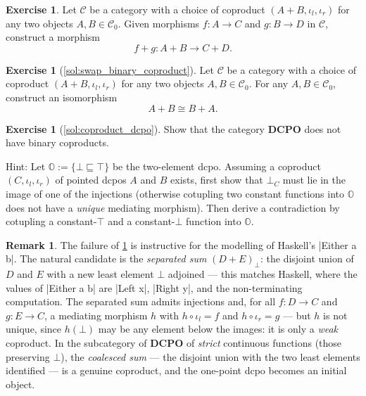 \documentclass[a4paper,11pt, oneside,titlepage=false]{scrbook}
\theoremstyle{plain}
\theoremstyle{definition}
\newtheorem{rem}[thm]{Remark}
\newtheorem{exer}[thm]{Exercise}
\newcommand{\Cat}[1]{\mathcal{#1}}
\newcommand{\CC}{\Cat{C}}
\newcommand{\Catb}[1]{\mathbf{#1}}
\newcommand{\DCPO}{\Catb{DCPO}}
\newcommand{\Ob}[1]{{#1}_0}
\newcommand{\inl}{\ensuremath{\iota_l}}
\newcommand{\inr}{\ensuremath{\iota_r}}
\newcommand{\co}[2]{\ensuremath{#2 \circ #1}}
\begin{document}
\begin{exer}\label{exer:coproduct_of_morphisms}
  Let $\CC$ be a category with a choice of coproduct $(A + B, \inl, \inr)$ for any two objects $A,B\in \Ob{\CC}$.
  Given morphisms $f : A \to C$ and $g : B \to D$ in $\CC$, construct a morphism
  \[ f + g : A + B \to C + D.\]
\end{exer}

\begin{exer}[\cref{sol:swap_binary_coproduct}]\label{exer:swap_binary_coproduct}
  Let $\CC$ be a category with a choice of coproduct $(A+ B, \inl, \inr)$ for any two objects $A,B\in \Ob{\CC}$.
  For any $A, B \in \Ob\CC$, construct an isomorphism
  \[ A + B \cong B + A. \]
\end{exer}

\begin{exer}[\cref{sol:coproduct_dcpo}]\label{exer:coproduct_dcpo}
  Show that the category $\DCPO$ does not have binary coproducts.

  Hint: Let $\mathbb{O} := \{\bot \sqsubseteq \top\}$ be the two-element dcpo.
  Assuming a coproduct $(C, \inl, \inr)$ of pointed dcpos $A$ and $B$ exists,
  first show that $\bot_C$ must lie in the image of one of the injections
  (otherwise cotupling two constant functions into $\mathbb{O}$ does not have a
  \emph{unique} mediating morphism).
  Then derive a contradiction by cotupling a constant-$\top$ and a
  constant-$\bot$ function into $\mathbb{O}$.
\end{exer}

\begin{rem}
  The failure of \cref{exer:coproduct_dcpo} is instructive for the modelling of
  Haskell's |Either a b|.
  The natural candidate is the \emph{separated sum} $(D + E)_\bot$: the disjoint
  union of $D$ and $E$ with a new least element $\bot$ adjoined --- this matches
  Haskell, where the values of |Either a b| are |Left x|, |Right y|, and the
  non-terminating computation.
  The separated sum admits injections and, for all $f : D \to C$ and
  $g : E \to C$, a mediating morphism $h$ with $\co{\inl}{h} = f$ and
  $\co{\inr}{h} = g$ --- but $h$ is not unique, since $h(\bot)$ may be any
  element below the images: it is only a \emph{weak} coproduct.
  In the subcategory of $\DCPO$ of \emph{strict} continuous functions (those
  preserving $\bot$), the \emph{coalesced sum} --- the disjoint union with the
  two least elements identified --- is a genuine coproduct, and the one-point
  dcpo becomes an initial object.
\end{rem}
\end{document}
